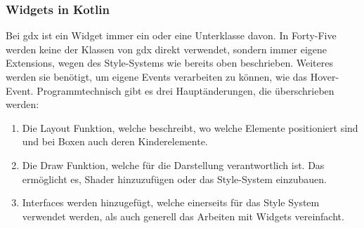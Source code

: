 \subsubsection{Widgets in Kotlin}\label{subsubsec:widgetsinkotlin}
\renewcommand{\kapitelautor}{Autor: Felix Zwickelstorfer}
Bei gdx ist ein Widget immer ein  oder eine Unterklasse davon.
In Forty-Five werden keine der Klassen von gdx direkt verwendet, sondern immer eigene Extensions, wegen des Style-Systems wie bereits oben beschrieben.
Weiteres werden sie benötigt, um eigene Events verarbeiten zu können, wie das Hover-Event.
Programmtechnisch gibt es drei Hauptänderungen, die überschrieben werden:
\begin{enumerate}
    \item Die Layout Funktion, welche beschreibt, wo welche Elemente positioniert sind und bei Boxen auch deren Kinderelemente.
    \item Die Draw Funktion, welche für die Darstellung verantwortlich ist. Das ermöglicht es, Shader hinzuzufügen oder das Style-System einzubauen.
    \item Interfaces werden hinzugefügt, welche einerseits für das Style System verwendet werden, als auch generell das Arbeiten mit Widgets vereinfacht.
\end{enumerate}
\renewcommand{\kapitelautor}{Autor: Felix Zwickelstorfer}
